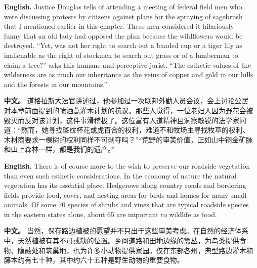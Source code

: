 \noindent\textbf{English.} Justice Douglas tells of attending a meeting of federal field men who were discussing protests by citizens against plans for the spraying of sagebrush that I mentioned earlier in this chapter. These men considered it hilariously funny that an old lady had opposed the plan because the wildflowers would be destroyed. ``Yet, was not her right to search out a banded cup or a tiger lily as inalienable as the right of stockmen to search out grass or of a lumberman to claim a tree?'' asks this humane and perceptive jurist. ``The esthetic values of the wilderness are as much our inheritance as the veins of copper and gold in our hills and the forests in our mountains.''
\par
\noindent\textbf{中文。} 道格拉斯大法官讲述过，他参加过一次联邦外勤人员会议，会上讨论公民对本章前面提到的喷洒蒿灌木计划的抗议。那些人觉得，一位老妇人因为野花会被毁灭而反对该计划，这件事滑稽极了。这位富有人道精神且洞察敏锐的法学家问道：“然而，她寻找斑纹杯花或虎百合的权利，难道不和牧场主寻找牧草的权利、木材商要求一棵树的权利同样不可剥夺吗？”“荒野的审美价值，正如山中铜金矿脉和山上森林一样，都是我们的遗产。”
\par\medskip

\noindent\textbf{English.} There is of course more to the wish to preserve our roadside vegetation than even such esthetic considerations. In the economy of nature the natural vegetation has its essential place. Hedgerows along country roads and bordering fields provide food, cover, and nesting areas for birds and homes for many small animals. Of some 70 species of shrubs and vines that are typical roadside species in the eastern states alone, about 65 are important to wildlife as food.
\par
\noindent\textbf{中文。} 当然，保存路边植被的愿望并不只出于这些审美考虑。在自然的经济体系中，天然植被有其不可或缺的位置。乡间道路和田地边缘的篱丛，为鸟类提供食物、隐蔽处和筑巢地，也为许多小动物提供家园。仅在东部各州，典型路边灌木和藤本约有七十种，其中约六十五种是野生动物的重要食物。
\par\medskip

